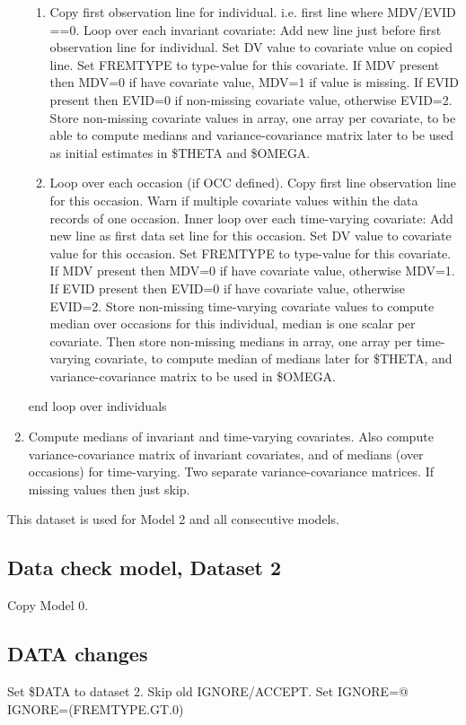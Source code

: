\begin{enumerate}
\begin{enumerate}
	\item Copy first observation line for individual. i.e. first line where MDV/EVID ==0. Loop over each invariant covariate: Add new line just before first observation line for individual. Set DV value to covariate value on copied line. Set FREMTYPE to type-value for this covariate. If MDV present then MDV=0 if have covariate value, MDV=1 if value is missing. If EVID present then EVID=0 if non-missing covariate value, otherwise EVID=2. Store non-missing covariate values in array, one array per covariate, to be able to compute medians and variance-covariance matrix later to be used as initial estimates in \$THETA and \$OMEGA. 
	\item Loop over each occasion (if OCC defined). Copy first line observation line for this occasion. Warn if multiple  covariate values within the data records of one occasion. Inner loop over each time-varying covariate: Add new line as first data set line for this occasion. Set DV value to covariate value for this occasion. Set FREMTYPE to type-value for this covariate. If MDV present then MDV=0 if have covariate value, otherwise MDV=1. If EVID present then EVID=0 if have covariate value, otherwise EVID=2. Store non-missing time-varying covariate values to compute median over occasions for this individual, median is one scalar per covariate. Then store non-missing medians in array, one array per time-varying covariate, to compute median of medians later for \$THETA, and variance-covariance matrix  to be used in \$OMEGA.
\end{enumerate}
end loop over individuals
	\item Compute medians of invariant and time-varying covariates. Also compute variance-covariance matrix of invariant covariates, and of medians (over occasions) for time-varying. Two separate variance-covariance matrices. If missing values then just skip.
\end{enumerate}

This dataset is used for Model 2 and all consecutive models.

\subsection{Data check model, Dataset 2}
Copy Model 0.

\subsection{DATA changes}
Set \$DATA to dataset 2. Skip old IGNORE/ACCEPT. Set IGNORE=@ IGNORE=(FREMTYPE.GT.0)

